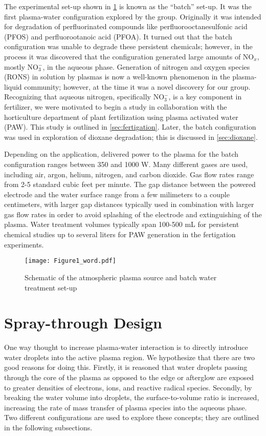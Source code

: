The experimental set-up shown in \cref{fig:batch_scheme} is known as the ``batch'' set-up. It was the first plasma-water configuration explored by the group. Originally it was intended for degradation of perfluorinated compounds like perfluorooctanesulfonic acid (PFOS) and perfluorootanoic acid (PFOA). It turned out that the batch configuration was unable to degrade these persistent chemicals; however, in the process it was discovered that the configuration generated large amounts of NO$_x$, mostly NO$_3^-$, in the aqueous phase. Generation of nitrogen and oxygen species (RONS) in solution by plasmas is now a well-known phenomenon in the plasma-liquid community; however, at the time it was a novel discovery for our group. Recognizing that aqueous nitrogen, specifically NO$_3^-$, is a key component in fertilizer, we were motivated to begin a study in collaboration with the horticulture department of plant fertilization using plasma activated water (PAW). This study is outlined in \cref{sec:fertigation}. Later, the batch configuration was used in exploration of dioxane degradation; this is discussed in \cref{sec:dioxane}.

Depending on the application, delivered power to the plasma for the batch configuration ranges between 350 and 1000 W. Many different gases are used, including air, argon, helium, nitrogen, and carbon dioxide. Gas flow rates range from 2-5 standard cubic feet per minute. The gap distance between the powered electrode and the water surface range from a few milimeters to a couple centimeters, with larger gap distances typically used in combination with larger gas flow rates in order to avoid splashing of the electrode and extinguishing of the plasma. Water treatment volumes typically span 100-500 mL for persistent chemical studies up to several liters for PAW generation in the fertigation experiments.

\begin{figure}[htbp]
  \centering
  \texttt{[image: Figure1\_word.pdf]}
  \caption{Schematic of the atmospheric plasma source and batch water treatment set-up}
  \label{fig:batch_scheme}
\end{figure}

\section{Spray-through Design}
\label{sec:spray}

One way thought to increase plasma-water interaction is to directly introduce water droplets into the active plasma region. We hypothesize that there are two good reasons for doing this. Firstly, it is reasoned that water droplets passing through the core of the plasma as opposed to the edge or afterglow are exposed to greater densities of electrons, ions, and reactive radical species. Secondly, by breaking the water volume into droplets, the surface-to-volume ratio is increased, increasing the rate of mass transfer of plasma species into the aqueous phase. Two different configurations are used to explore these concepts; they are outlined in the following subsections.

